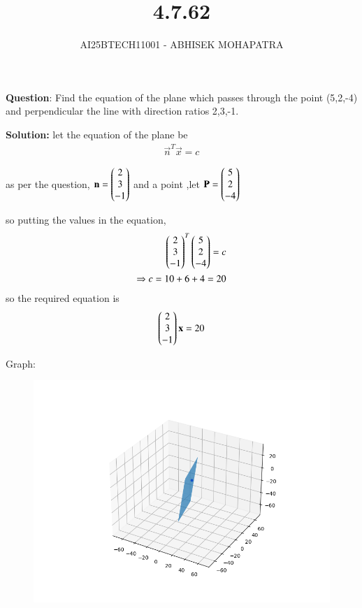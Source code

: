\documentclass[journal,12pt,onecolumn]{IEEEtran}
\begin{document}
\title{4.7.62}
\author{AI25BTECH11001 - ABHISEK MOHAPATRA}
{\let\newpage\relax\maketitle}
	 	\textbf{Question}:
Find the equation of the plane which passes through the point (5,2,-4) and perpendicular the line with direction ratios 2,3,-1.


		\textbf{Solution:} let the equation of the plane be 
\begin{align}
		\vec{n}^T\vec{x} = c
\end{align}

as per the question, $\mathbf{n} = \begin{pmatrix}2\\3\\-1\end{pmatrix}$ and a point ,let $\mathbf{P} = \begin{pmatrix}5\\2\\-4\end{pmatrix}$ 

so putting the values in the equation,
\begin{align}
		\begin{pmatrix}2\\3\\-1\end{pmatrix}^T\begin{pmatrix}5\\2\\-4\end{pmatrix} = c\\
		\Rightarrow c = 10 + 6 +4 = 20
\end{align}
so the required equation is
\begin{align}
		\begin{pmatrix}2\\3\\-1\end{pmatrix}\mathbf{x} = 20
\end{align}

Graph:
\begin{figure}[h!]
	\centering
	\includegraphics[width=0.7\linewidth]{img.png}
\end{figure}
\end{document}
